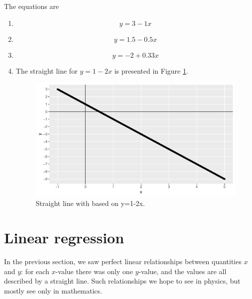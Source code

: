 \documentclass[]{report}\usepackage[]{graphicx}\usepackage[]{color}
\makeatletter
\def\maxwidth{ %
  \ifdim\Gin@nat@width>\linewidth
    \linewidth
  \else
    \Gin@nat@width
  \fi
}
\newenvironment{knitrout}{}{} %
\makeatother
\begin{document}
The equations are
\begin{enumerate}
\item 
\begin{equation}
y = 3 - 1 x
\end{equation}
\item
\begin{equation}
y = 1.5 - 0.5 x
\end{equation}
\item
\begin{equation}
y = -2 + 0.33 x
\end{equation}
\item
The straight line for $y=1 - 2x$ is presented in Figure \ref{fig:lm_7}.

\begin{knitrout}
\color{fgcolor}\begin{figure}

{\centering \includegraphics[width=\maxwidth]{figure/lm_7-1} 

}

\caption[Straight line with based on y=1-2x]{Straight line with based on y=1-2x.}\label{fig:lm_7}
\end{figure}


\end{knitrout}
\end{enumerate}
\section{Linear regression}

In the previous section, we saw perfect linear relationships between quantities $x$ and $y$: for each $x$-value there was only one $y$-value, and the values are all described by a straight line. Such relationships we hope to see in physics, but mostly see only in mathematics.
\end{document}
